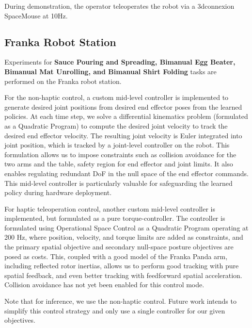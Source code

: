 \documentclass[Afour,sageh,times]{sagej}
\begin{document}
During demonstration, the operator teleoperates the robot via a 3dconnexion SpaceMouse at 10Hz.

\subsection{Franka Robot Station}
\label{sec:franka_setup}
Experiments for \textbf{Sauce Pouring and Spreading, Bimanual Egg Beater, Bimanual Mat Unrolling, and
Bimanual Shirt Folding} tasks are performed on the Franka robot station. 

For the non-haptic control, a custom mid-level controller is implemented to generate desired joint positions from desired end effector poses from the learned policies. At each time step, we solve a differential kinematics problem (formulated as a Quadratic Program) to compute the desired joint velocity to track the desired end effector velocity. The resulting joint velocity is Euler integrated into joint position, which is tracked by a joint-level controller on the robot. This formulation allows us to impose constraints such as collision avoidance for the two arms and the table, safety region for end effector and joint limits. It also enables regulating redundant DoF in the null space of the end effector commands. This mid-level controller is particularly valuable for safeguarding the learned policy during hardware deployment. 

For haptic teleoperation control, another custom mid-level controller is implemented, but formulated as a pure torque-controller. The controller is formulated using Operational Space Control \citet{khatib1987osc} as a Quadratic Program operating at 200 Hz, where position, velocity, and torque limits are added as constraints, and the primary spatial objective and secondary null-space posture objectives are posed as costs.
This, coupled with a good model of the Franka Panda arm, including reflected rotor inertias, allows us to perform
good tracking with pure spatial feedback, and even better tracking with feedforward spatial acceleration.
Collision avoidance has not yet been enabled for this control mode.

Note that for inference, we use the non-haptic control. Future work intends to simplify
this control strategy and only use a single controller for our given objectives.
\end{document}
